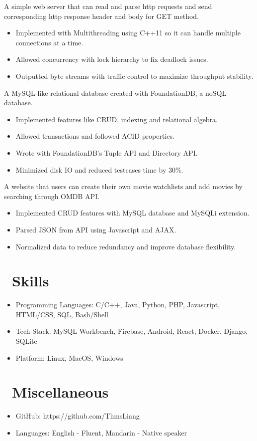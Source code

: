 \documentclass{resume}
\begin{document}
  A simple web server that can read and parse http requests and send corresponding http response header and body for GET method.
\begin{itemize}
  \item Implemented with Multithreading using C++11 so it can handle multiple connections at a time.
  \item Allowed concurrency with lock hierarchy to fix deadlock issues.
  \item Outputted byte streams with traffic control to maximize throughput stability.
\end{itemize}

  A MySQL-like relational database created with FoundationDB, a noSQL database.
\begin{itemize}
  \item Implemented features like CRUD, indexing and relational algebra.
  \item Allowed transactions and followed ACID properties.
  \item Wrote with FoundationDB's Tuple API and Directory API.
  \item Minimized disk IO and reduced testcases time by 30\%.
\end{itemize}

A website that users can create their own movie watchlists and add movies by searching through OMDB API.
\begin{itemize}
  \item Implemented CRUD features with MySQL database and MySQLi extension.
  \item Parsed JSON from API using Javascript and AJAX.
  \item Normalized data to reduce redundancy and improve database flexibility.
\end{itemize}

\section{\faCogs\ Skills}
\begin{itemize}[parsep=0.5ex]
  \item Programming Languages: C/C++, Java, Python, PHP, Javascript, HTML/CSS, SQL, Bash/Shell
  \item Tech Stack: MySQL Workbench, Firebase, Android, React, Docker, Django, SQLite
  \item Platform: Linux, MacOS, Windows
\end{itemize}

\section{\faInfo\ Miscellaneous}
\begin{itemize}[parsep=0.5ex]
  \item GitHub: https://github.com/ThmsLiang
  \item Languages: English - Fluent, Mandarin - Native speaker
\end{itemize}
\end{document}
